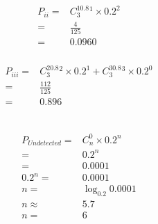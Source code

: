 \documentclass{article}
\begin{document}
            \subsubsection{}
                \begin{equation*}
                    \begin{split}
                        P_{ii}=&C_3^10.8^1\times 0.2^2\\
                            =&\frac{4}{125}\\
                            =&0.0960
                    \end{split}
                \end{equation*}
            \subsubsection{}
                \begin{equation*}
                    \begin{split}
                        P_{iii}=&C_3^20.8^2\times 0.2^1+C_3^30.8^3\times 0.2^0\\
                            =&\frac{112}{125}\\
                            =&0.896\\
                    \end{split}
                \end{equation*}
        \subsection{}
            \subsubsection{}
                \begin{equation*}
                    \begin{split}
                        P_{Undetected}=&C_n^0\times0.2^n\\
                            =&0.2^n\\
                            =&0.0001\\
                        0.2^n=&0.0001\\
                        n=&\log_{0.2}0.0001\\
                        n\approx&5.7\\
                        n=&6\\
                    \end{split}
                \end{equation*}
\end{document}
